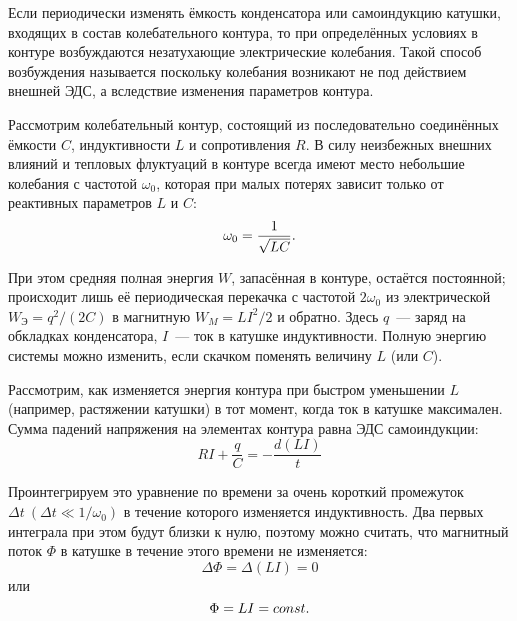 


Если периодически изменять ёмкость конденсатора или самоиндукцию катушки, входящих в состав колебательного контура, то при определённых условиях в контуре возбуждаются незатухающие электрические колебания. Такой способ возбуждения называется  поскольку колебания возникают не под действием внешней ЭДС, а вследствие изменения параметров контура. 

Рассмотрим колебательный контур, состоящий из последовательно соединённых ёмкости $C$, индуктивности $L$ и сопротивления $R$. В силу неизбежных внешних влияний и тепловых флуктуаций в контуре всегда имеют место небольшие колебания с частотой $\omega_0$, которая при малых потерях зависит только от реактивных параметров $L$ и $C$:
\begin{equation}
	\eqmark{4.6.1}
	 \omega_0 = \frac{1}{\sqrt{LC}}.
\end{equation}

При этом средняя полная энергия $W$, запасённая в контуре, остаётся постоянной; происходит лишь её периодическая перекачка с частотой $2\omega_0$ из электрической $W_\text{Э} = q^2 / (2C)$ в магнитную $W_M = LI^2/2$ и обратно. Здесь $q$~--- заряд на обкладках конденсатора, $I$~--- ток в катушке индуктивности. Полную энергию системы можно изменить, если скачком поменять величину $L$ (или $C$).

 Рассмотрим, как изменяется энергия контура при быстром уменьшении $L$ (например, растяжении катушки) в тот момент, когда ток в катушке максимален. Сумма падений напряжения на элементах контура равна ЭДС самоиндукции:
\begin{equation*}
	RI + \frac{q}{C}= - \frac{d(LI)}{t}
\end{equation*}

Проинтегрируем это уравнение по времени за очень короткий промежуток $\Delta t ~(\Delta t \ll 1/\omega_0)$ в течение которого изменяется индуктивность. Два первых интеграла при этом будут близки к нулю, поэтому можно считать, что магнитный поток $\Phi$ в катушке в течение этого времени не изменяется: 
\begin{equation*}
	\Delta \Phi=\Delta (LI) = 0
\end{equation*}
 или 
\begin{equation}
	\eqmark{4.6.2}
	\Phi=LI =const.
\end{equation}

